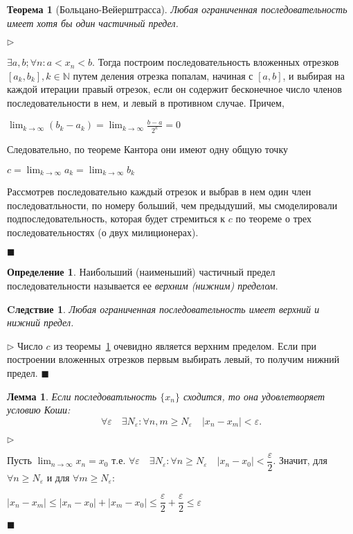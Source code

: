 \documentclass{urticle}
\newtheorem{theorem}{Теорема}
\newtheorem{lemma}{Лемма}
\newtheorem{consectary}{Cледствие}
\theoremstyle{definition}
\newtheorem{definition}{Определение}
\newcommand{\prf}[1]{\hspace{0.3cm}$\triangleright$ \hspace{0.2cm} {#1} \hfill $\blacksquare$ }
\begin{document}
    \begin{theorem}[Больцано-Вейерштрасса]
    \label{th:Bol-Ver}
        Любая ограниченная последовательность имеет хотя бы один частичный предел.
    \end{theorem}
    \prf{$\exists a, b; \forall n: a < x_n < b$. Тогда построим последовательность вложенных отрезков $[a_k, b_k], k\in\mathbb{N}$ путем деления отрезка попалам, начиная с $[a, b]$, и выбирая на каждой итерации правый отрезок, если он содержит бесконечное число членов последовательности в нем, и левый в противном случае. Причем, 
    \begin{center}
        $\displaystyle \lim_{k\to\infty}(b_k - a_k) = \lim_{k\to\infty} \frac{b-a}{2^k} = 0$  
    \end{center}        
    Следовательно, по теореме Кантора они имеют одну общую точку
    \begin{center}
        $\displaystyle c = \lim_{k\to\infty}a_k = \lim_{k\to\infty}b_k$
    \end{center}
    Рассмотрев последовательно каждый отрезок и выбрав в нем один член последоватльности, по номеру больший, чем предыдуший, мы смоделировали подпоследовательность, которая будет стремиться к $c$ по теореме о трех последовательностях (о двух милиционерах).
    }
    
    \begin{definition}
    \label{def:UpLowLimit}    
        Наибольший (наименьший) частичный предел последовательности называется ее \textit{верхним (нижним) пределом}.
    \end{definition}
    
    \begin{consectary}
    \label{th:UpLowLimit}    
        Любая ограниченная последовательность имеет верхний и нижний предел.
    \end{consectary}
    \prf{Число $c$ из теоремы~\ref{th:Bol-Ver} очевидно является верхним пределом. Если при построении вложенных отрезков первым выбирать левый, то получим нижний предел. }
    
    \begin{lemma}
    \label{lem:Koshi}
        Если последоватльность $\{x_n\}$ сходится, то она удовлетворяет условию Коши:
        \begin{equation}
        \label{IfKoshi}
            \forall\varepsilon  \quad \exists N_\varepsilon: \forall n,m \geq N_\varepsilon \quad |x_n - x_m| < \varepsilon.
        \end{equation}
    \end{lemma}
    \prf{Пусть $\displaystyle \lim_{n\to\infty}x_n = x_0$ т.е. $\forall\varepsilon  \quad \exists N_\varepsilon: \forall n \geq N_\varepsilon \quad |x_n - x_0| < \dfrac{\varepsilon}{2}$. Значит, для $\forall n \geq N_\varepsilon$ и для $\forall m \geq N_\varepsilon$:
    \begin{center}
        $|x_n - x_m| \leq |x_n - x_0| + |x_m - x_0| \leq \dfrac{\varepsilon}{2} + \dfrac{\varepsilon}{2} \leq \varepsilon $
    \end{center}}
        
\end{document}
